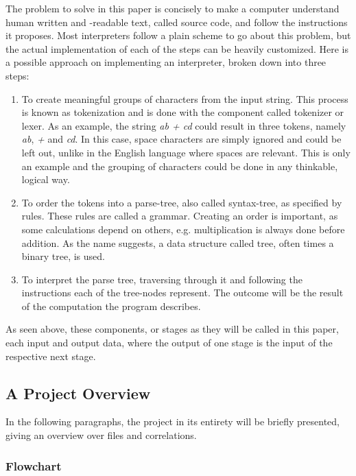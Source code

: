 \documentclass[12pt,a4paper]{article}
\newcommand{\pagelabel}[1]{\phantomsection\label{#1}}
\begin{document}
The problem to solve in this paper is concisely to make a computer understand
human written and -readable text, called source code, and follow the instructions
it proposes.
Most interpreters follow a plain scheme to go about this problem, but the
actual implementation of each of the steps can be heavily customized.
Here is a possible approach on implementing an interpreter, broken
down into three steps:
\begin{enumerate}\pagelabel{simple_interpreter}
    \item To create meaningful groups of characters from the input string. This
        process is known as tokenization and is done with the component called
        tokenizer or lexer. As an example, the string \emph{ab + cd} could result
        in three tokens, namely \emph{ab}, \emph{+} and \emph{cd}. In this case, space characters
        are simply ignored and could be left out, unlike in the English language where spaces are relevant. 
        This is only an example and the grouping of characters could be done 
        in any thinkable, logical way.
    \item To order the tokens into a parse-tree, also called syntax-tree, as
        specified by rules. These rules are called a grammar.
        Creating an order is important, as some calculations depend on others, e.g. multiplication
        is always done before addition. As the name suggests, a data structure
        called tree, often times a binary tree, is used.
    \item To interpret the parse tree, traversing through it and following the
        instructions each of the tree-nodes represent. The outcome
        will be the result of the computation the program describes.
\end{enumerate}

As seen above, these components, or stages as they will be called in this paper,
each input and output data, where the output of one stage is the input of the
respective next stage.

\newpage\subsection{A Project Overview}
In the following paragraphs, the project in its entirety will be briefly
presented, giving an overview over files and correlations.

\subsubsection{Flowchart}
\end{document}
